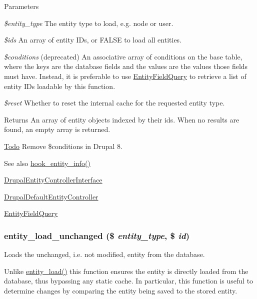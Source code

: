 \begin{DoxyParams}{Parameters}
\item[{\em \$entity\_\-type}]The entity type to load, e.g. node or user. \item[{\em \$ids}]An array of entity IDs, or FALSE to load all entities. \item[{\em \$conditions}](deprecated) An associative array of conditions on the base table, where the keys are the database fields and the values are the values those fields must have. Instead, it is preferable to use \hyperlink{classEntityFieldQuery}{EntityFieldQuery} to retrieve a list of entity IDs loadable by this function. \item[{\em \$reset}]Whether to reset the internal cache for the requested entity type.\end{DoxyParams}
\begin{DoxyReturn}{Returns}
An array of entity objects indexed by their ids. When no results are found, an empty array is returned.
\end{DoxyReturn}
\begin{Desc}
\item[\hyperlink{todo__todo000002}{Todo}]Remove \$conditions in Drupal 8.\end{Desc}
\begin{DoxySeeAlso}{See also}
\hyperlink{group__hooks_gaf02318e9d0e8cdbf6d187b271b9969a8}{hook\_\-entity\_\-info()} 

\hyperlink{interfaceDrupalEntityControllerInterface}{DrupalEntityControllerInterface} 

\hyperlink{classDrupalDefaultEntityController}{DrupalDefaultEntityController} 

\hyperlink{classEntityFieldQuery}{EntityFieldQuery} 
\end{DoxySeeAlso}
\hypertarget{common_8inc_ad6d77695e6a66026389a4a734202b253}{
\subsubsection[{entity\_\-load\_\-unchanged}]{\setlength{\rightskip}{0pt plus 5cm}entity\_\-load\_\-unchanged (\$ {\em entity\_\-type}, \/  \$ {\em id})}}
\label{common_8inc_ad6d77695e6a66026389a4a734202b253}
Loads the unchanged, i.e. not modified, entity from the database.

Unlike \hyperlink{common_8inc_a78b89cf93f9710a68d02f86adccf1898}{entity\_\-load()} this function ensures the entity is directly loaded from the database, thus bypassing any static cache. In particular, this function is useful to determine changes by comparing the entity being saved to the stored entity.


